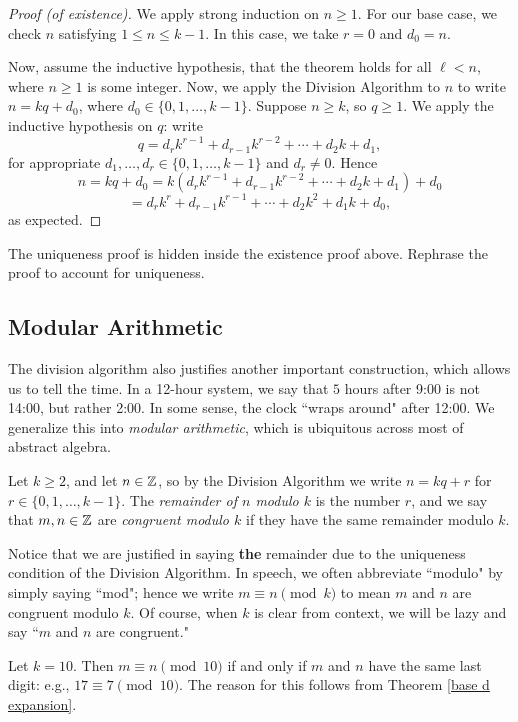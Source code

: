 \documentclass{article}
\begin{document}
\begin{proof}[Proof (of existence)]
We apply strong induction on $n\geq 1$. For our base case, we check $n$ satisfying $1 \leq n \leq k-1$. In this case, we take $r=0$ and $d_0 = n$.

Now, assume the inductive hypothesis, that the theorem holds for all $\ell < n$, where $n\geq 1$ is some integer. Now, we apply the Division Algorithm to $n$ to write $n = kq + d_0$, where $d_0\in\{0, 1, \ldots, k-1\}$. Suppose $n\geq k$, so $q\geq 1$. We apply the inductive hypothesis on $q$: write
$$q = d_rk^{r-1} + d_{r-1}k^{r-2} + \cdots + d_2k + d_1,$$
for appropriate $d_1, \ldots, d_r\in \{0,1, \ldots, k-1\}$ and $d_r \neq 0$. Hence
$$n = kq + d_0 = k(d_r k^{r-1} + d_{r-1}k^{r-2} + \cdots + d_2k + d_1) + d_0$$
$$=d_rk^r + d_{r-1}k^{r-1} + \cdots + d_2k^2 + d_1k + d_0,$$
as expected.
\end{proof}
\begin{exercise}
The uniqueness proof is hidden inside the existence proof above. Rephrase the proof to account for uniqueness.
\end{exercise}

\subsection*{Modular Arithmetic}
The division algorithm also justifies another important construction, which allows us to tell the time. In a 12-hour system, we say that $5$ hours after 9:00 is not 14:00, but rather 2:00. In some sense, the clock ``wraps around" after 12:00. We generalize this into \textit{modular arithmetic}, which is ubiquitous across most of abstract algebra.
\begin{definition}
Let $k\geq 2$, and let $n\in\mathbb Z$, so by the Division Algorithm we write $n = kq+r$ for $r\in\{0, 1, \ldots, k-1\}$. The \textit{remainder of $n$ modulo $k$} is the number $r$, and we say that $m,n\in\mathbb Z$ are \textit{congruent modulo $k$} if they have the same remainder modulo $k$.
\end{definition}
Notice that we are justified in saying \textbf{the} remainder due to the uniqueness condition of the Division Algorithm. In speech, we often abbreviate ``modulo" by simply saying ``mod"; hence we write $m\equiv n\pmod k$ to mean $m$ and $n$ are congruent modulo $k$. Of course, when $k$ is clear from context, we will be lazy and say ``$m$ and $n$ are congruent."
\begin{example}
Let $k=10$. Then $m\equiv n\pmod{10}$ if and only if $m$ and $n$ have the same last digit: e.g., $17 \equiv 7\pmod{10}$. The reason for this follows from Theorem \ref{base d expansion}.
\end{example}
\end{document}
